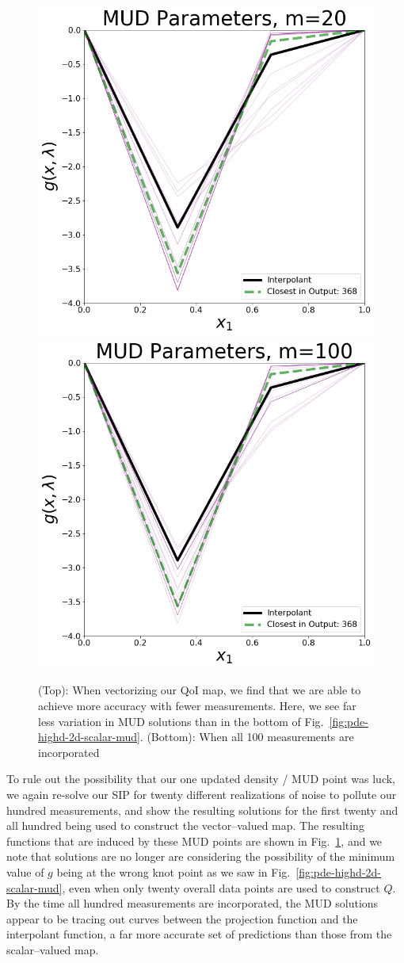 \begin{figure}[htbp]
\centering
  \includegraphics[width=0.6\linewidth]{figures/pde-highd/pde-highd_pair_D2-2_m20}
  \includegraphics[width=0.6\linewidth]{figures/pde-highd/pde-highd_pair_D2-2_m100}
\caption{
(Top): When vectorizing our QoI map, we find that we are able to achieve more accuracy with fewer measurements. Here, we see far less variation in MUD solutions than in the bottom of Fig.~\ref{fig:pde-highd-2d-scalar-mud}.
(Bottom): When all 100 measurements are incorporated
}
\label{fig:pde-highd-2d-vector-mud}
\end{figure}

To rule out the possibility that our one updated density / MUD point was luck, we again re-solve our SIP for twenty different realizations of noise to pollute our hundred measurements, and show the resulting solutions for the first twenty and all hundred being used to construct the vector--valued map.
The resulting functions that are induced by these MUD points are shown in Fig.~\ref{fig:pde-highd-2d-vector-mud}, and we note that solutions are no longer are considering the possibility of the minimum value of $g$ being at the wrong knot point as we saw in Fig.~\ref{fig:pde-highd-2d-scalar-mud}, even when only twenty overall data points are used to construct $Q$.
By the time all hundred measurements are incorporated, the MUD solutions appear to be tracing out curves between the projection function and the interpolant function, a far more accurate set of predictions than those from the scalar--valued map.

